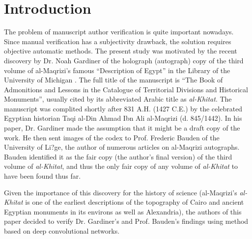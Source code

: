 \documentclass[conference]{IEEEtran}
\begin{document}
\section{Introduction}
\label{sec:introduction}
The problem of manuscript author verification is quite important nowadays. Since manual verification has a subjectivity drawback, the solution requires objective automatic methods. The present study was motivated by the recent discovery by Dr. Noah Gardiner of the holograph (autograph) copy of the third volume of al-Maqrizi's famous ``Description of Egypt'' in the Library of the University of Michigan \cite{Noah}. The full title of the manuscript is ``The Book of Admonitions and Lessons in the Catalogue of Territorial Divisions and Historical Monuments'', usually cited by its abbreviated Arabic title as \textit{al-Khitat}. The manuscript was complited shortly after 831 A.H. (1427 C.E.) by the celebrated Egyptian historian Taqi al-Din Ahmad Ibn Ali al-Maqrizi (d. 845/1442). In his paper, Dr. Gardiner made the assumption that it might be a draft copy of the work. He then sent images of the codex to Prof. Frederic Bauden of the University of Li?ge, the author of numerous articles on al-Maqrizi autographs. Bauden identified it as the fair copy (the author's final version) of the third volume of \textit{al-Khitat}, and thus the only fair copy of any volume of \textit{al-Khitat} to have been found thus far.

Given the importance of this discovery for the history of science (al-Maqrizi's \textit{al-Khitat} is one of the earliest descriptions of the topography of Cairo and ancient Egyptian monuments in its environs as well as Alexandria), the authors of this paper decided to verify Dr. Gardiner's and Prof. Bauden's findings using method based on deep convolutional networks.
\end{document}
